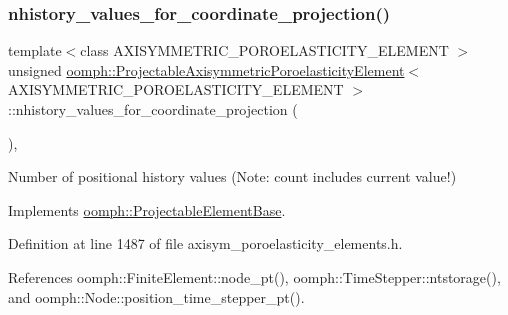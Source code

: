 \subsubsection{\texorpdfstring{nhistory\+\_\+values\+\_\+for\+\_\+coordinate\+\_\+projection()}{nhistory\_values\_for\_coordinate\_projection()}}
{\footnotesize\ttfamily template$<$class A\+X\+I\+S\+Y\+M\+M\+E\+T\+R\+I\+C\+\_\+\+P\+O\+R\+O\+E\+L\+A\+S\+T\+I\+C\+I\+T\+Y\+\_\+\+E\+L\+E\+M\+E\+NT $>$ \\
unsigned \hyperlink{classoomph_1_1ProjectableAxisymmetricPoroelasticityElement}{oomph\+::\+Projectable\+Axisymmetric\+Poroelasticity\+Element}$<$ A\+X\+I\+S\+Y\+M\+M\+E\+T\+R\+I\+C\+\_\+\+P\+O\+R\+O\+E\+L\+A\+S\+T\+I\+C\+I\+T\+Y\+\_\+\+E\+L\+E\+M\+E\+NT $>$\+::nhistory\+\_\+values\+\_\+for\+\_\+coordinate\+\_\+projection (\begin{DoxyParamCaption}{ }\end{DoxyParamCaption})\hspace{0.3cm}{\ttfamily [inline]}, {\ttfamily [virtual]}}



Number of positional history values (Note\+: count includes current value!) 



Implements \hyperlink{classoomph_1_1ProjectableElementBase_ab4ecd0cd24000a3ed675dc7198203c1f}{oomph\+::\+Projectable\+Element\+Base}.



Definition at line 1487 of file axisym\+\_\+poroelasticity\+\_\+elements.\+h.



References oomph\+::\+Finite\+Element\+::node\+\_\+pt(), oomph\+::\+Time\+Stepper\+::ntstorage(), and oomph\+::\+Node\+::position\+\_\+time\+\_\+stepper\+\_\+pt().

\mbox{\label{classoomph_1_1ProjectableAxisymmetricPoroelasticityElement_afa3e26efcd834f12046852303709c4f7}} 

